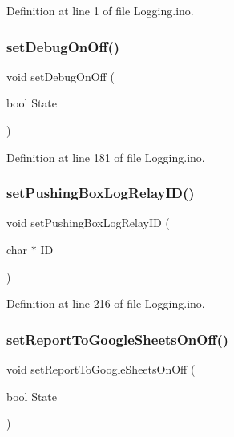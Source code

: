 Definition at line 1 of file Logging.\+ino.

\mbox{\label{_logging_8ino_aabf3a969519c0ffa581d20e8ccf4eff3}} 
\subsubsection{\texorpdfstring{setDebugOnOff()}{setDebugOnOff()}}
{\footnotesize\ttfamily void set\+Debug\+On\+Off (\begin{DoxyParamCaption}\item[{bool}]{State }\end{DoxyParamCaption})}



Definition at line 181 of file Logging.\+ino.

\mbox{\label{_logging_8ino_a03f4d69dc6bf7b5c9fd74920ade37f30}} 
\subsubsection{\texorpdfstring{setPushingBoxLogRelayID()}{setPushingBoxLogRelayID()}}
{\footnotesize\ttfamily void set\+Pushing\+Box\+Log\+Relay\+ID (\begin{DoxyParamCaption}\item[{char $\ast$}]{ID }\end{DoxyParamCaption})}



Definition at line 216 of file Logging.\+ino.

\mbox{\label{_logging_8ino_ad5732ad0ac20950bf20e87b219c679c5}} 
\subsubsection{\texorpdfstring{setReportToGoogleSheetsOnOff()}{setReportToGoogleSheetsOnOff()}}
{\footnotesize\ttfamily void set\+Report\+To\+Google\+Sheets\+On\+Off (\begin{DoxyParamCaption}\item[{bool}]{State }\end{DoxyParamCaption})}




